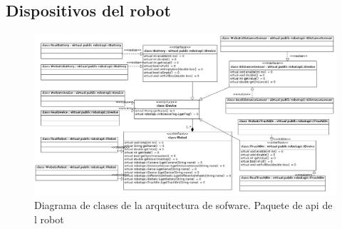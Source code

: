 \subsection{Dispositivos del robot}
\begin{landscape}
\begin{figure}[h]
	\centering
	\includegraphics[scale=0.5]{comportamientos/figures/api2.png}
	\caption[Arquitectura de software: api de robot]{Diagrama de clases de la arquitectura
			de sofware. Paquete de api de l robot}
	\label{fig:soft_arq_devices}
\end{figure}
\end{landscape}

